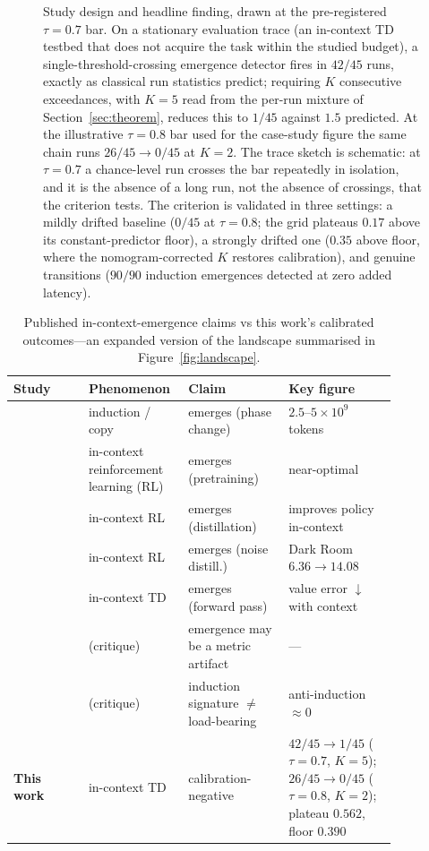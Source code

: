 \documentclass[11pt]{article}
\theoremstyle{plain}
\theoremstyle{definition}
\begin{document}
\begin{figure}[t]
\centering
{}
\caption{Study design and headline finding, drawn at the pre-registered $\tau=0.7$ bar. On a stationary evaluation trace (an in-context TD testbed that does not acquire the task within the studied budget), a single-threshold-crossing emergence detector fires in $42/45$ runs, exactly as classical run statistics predict; requiring $K$ consecutive exceedances, with $K=5$ read from the per-run mixture of Section~\ref{sec:theorem}, reduces this to $1/45$ against $1.5$ predicted. At the illustrative $\tau=0.8$ bar used for the case-study figure the same chain runs $26/45\to0/45$ at $K=2$. The trace sketch is schematic: at $\tau=0.7$ a chance-level run crosses the bar repeatedly in isolation, and it is the absence of a long run, not the absence of crossings, that the criterion tests. The criterion is validated in three settings: a mildly drifted baseline ($0/45$ at $\tau=0.8$; the grid plateaus $0.17$ above its constant-predictor floor), a strongly drifted one ($0.35$ above floor, where the nomogram-corrected $K$ restores calibration), and genuine transitions ($90/90$ induction emergences detected at zero added latency).}
\label{fig:scheme}
\end{figure}

\begin{table}[htbp]
\centering
\caption{Published in-context-emergence claims vs this work's calibrated outcomes---an
expanded version of the landscape summarised in Figure~\ref{fig:landscape}.}
\label{tab:emergence-landscape}
\small
\begin{tabular}{@{}>{\raggedright\arraybackslash}p{0.18\linewidth}>{\raggedright\arraybackslash}p{0.17\linewidth}>{\raggedright\arraybackslash}p{0.24\linewidth}>{\raggedright\arraybackslash}p{0.26\linewidth}@{}}
\toprule
Study & Phenomenon & Claim & Key figure \\
\midrule
\citet{olsson2022induction} & induction / copy & emerges (phase change) & $2.5$--$5{\times}10^{9}$ tokens \\
\citet{lee2023icrl} & in-context reinforcement learning (RL) & emerges (pretraining) & near-optimal \\
\citet{laskin2022ad} & in-context RL & emerges (distillation) & improves policy in-context \\
\citet{zisman2024noise} & in-context RL & emerges (noise distill.) & Dark Room $6.36\!\to\!14.08$ \\
\citet{wang2024tdtransformers} & in-context TD & emerges (forward pass) & value error $\downarrow$ with context \\
\citet{schaeffer2023mirage} & (critique) & emergence may be a metric artifact & --- \\
\citet{sabry2025induction} & (critique) & induction signature $\neq$ load-bearing & anti-induction ${\approx}0$ \\
\textbf{This work} & in-context TD & calibration-negative & $42/45\!\to\!1/45$ ($\tau{=}0.7$, $K{=}5$); $26/45\!\to\!0/45$ ($\tau{=}0.8$, $K{=}2$); plateau $0.562$, floor $0.390$ \\
\bottomrule
\end{tabular}
\end{table}
\end{document}
